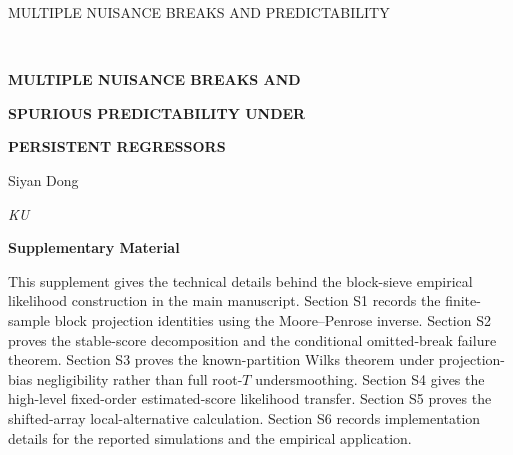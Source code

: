 \documentclass[10pt]{book}
\numberwithin{equation}{section}
\theoremstyle{definition}
\begin{document}
\raggedbottom

\renewcommand{\baselinestretch}{2}


{\hfill {\footnotesize\rm MULTIPLE NUISANCE BREAKS AND PREDICTABILITY} \hfill}

\renewcommand{\thefootnote}{}
$\ $\par \fontsize{12}{14pt plus.8pt minus .6pt}\selectfont

\centerline{\large\bf MULTIPLE NUISANCE BREAKS AND}
\vspace{2pt}
\centerline{\large\bf SPURIOUS PREDICTABILITY UNDER}
\vspace{2pt}
\centerline{\large\bf PERSISTENT REGRESSORS}
\vspace{.25cm}
\centerline{Siyan Dong}
\vspace{.4cm}
\centerline{\it KU}
\vspace{.55cm}
\centerline{\bf Supplementary Material}
\vspace{.55cm}
\fontsize{9}{11.5pt plus.8pt minus .6pt}\selectfont
\noindent
This supplement gives the technical details behind the block-sieve empirical likelihood construction in the main manuscript. Section S1 records the finite-sample block projection identities using the Moore--Penrose inverse. Section S2 proves the stable-score decomposition and the conditional omitted-break failure theorem. Section S3 proves the known-partition Wilks theorem under projection-bias negligibility rather than full root-\(T\) undersmoothing. Section S4 gives the high-level fixed-order estimated-score likelihood transfer. Section S5 proves the shifted-array local-alternative calculation. Section S6 records implementation details for the reported simulations and the empirical application.
\par

\setcounter{section}{0}
\setcounter{equation}{0}
\renewcommand{\thesection}{S\arabic{section}}
\renewcommand{\theequation}{\thesection.\arabic{equation}}
\renewcommand{\thelemma}{S\arabic{lemma}}
\renewcommand{\theproposition}{S\arabic{proposition}}
\renewcommand{\thecorollary}{S\arabic{corollary}}
\renewcommand{\thetheorem}{S\arabic{theorem}}
\renewcommand{\theremark}{S\arabic{remark}}

\fontsize{12}{14pt plus.8pt minus .6pt}\selectfont
\end{document}
